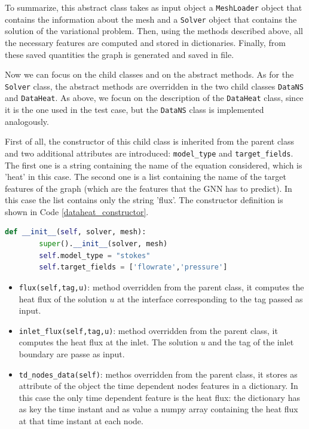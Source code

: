 \documentclass[11pt,a4paper]{article}
\begin{document}
To summarize, this abstract class takes as input  object a \texttt{MeshLoader} object that contains the information about the mesh and a \texttt{Solver} object that contains the solution of the variational problem. Then, using the methods described above, all the necessary features are computed and stored in dictionaries. Finally, from these saved quantities the graph is generated and saved in file. 

Now we can focus on the child classes and on the abstract methods.
As for the \texttt{Solver} class, the abstract methods are overridden in the two child classes \texttt{DataNS} and \texttt{DataHeat}. 
As above, we focun on the description of the \texttt{DataHeat} class, since it is the one used in the test case, but the \texttt{DataNS} class is implemented analogously. 

First of all, the constructor of this child class is inherited from the parent class and two additional attributes are introduced: \texttt{model\_type} and \texttt{target\_fields}. The first one is a string containing the name of the equation considered, which is 'heat' in this case. The second one is a list containing the name of the target features of the graph (which are the features that the GNN has to predict). In this case the list contains only the string 'flux'. The constructor definition is shown in Code \ref{dataheat_constructor}.

\begin{lstlisting}[language=Python, caption={Solver class.}, label={datagenerator}]
    def __init__(self, solver, mesh):
        super().__init__(solver, mesh)
        self.model_type = "stokes"
        self.target_fields = ['flowrate','pressure']
\end{lstlisting}


\begin{itemize}
    \item \texttt{flux(self,tag,u)}: method overridden from the parent class, it computes the heat flux of the solution \(u\) at the interface corresponding to the tag passed as input.
    \item \texttt{inlet\_flux(self,tag,u)}: method overridden from the parent class, it computes the heat flux at the inlet. The solution \(u\) and the tag of the inlet boundary are passe as input. 
    \item \texttt{td\_nodes\_data(self)}: methos overridden from the parent class, it stores as attribute of the object the time dependent nodes features in a dictionary. In this case the only time dependent feature is the heat flux: the dictionary has as key the time instant and as value a numpy array containing the heat flux at that time instant at each node.
    
\end{itemize}
\end{document}
